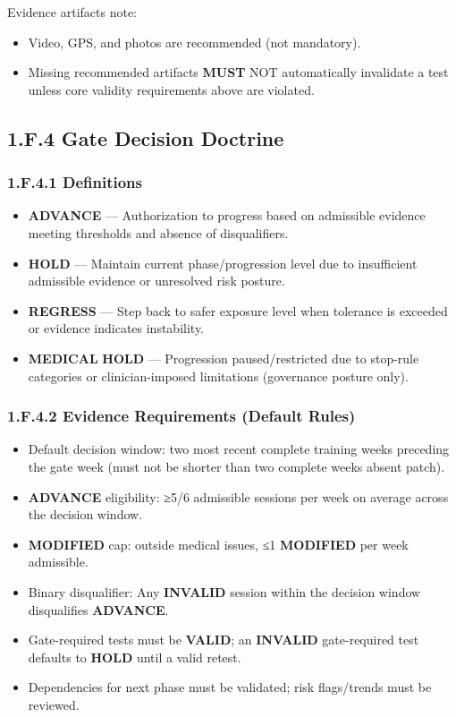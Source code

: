 \documentclass[10pt]{article}
\begin{document}
Evidence artifacts note:

\begin{itemize}
\item Video, GPS, and photos are recommended (not mandatory).
\item Missing recommended artifacts \textbf{MUST} NOT automatically invalidate a test unless core validity requirements above are violated.
\end{itemize}

\newpage

\subsection*{1.F.4 Gate Decision Doctrine}
{}

\subsubsection*{1.F.4.1 Definitions}

\begin{itemize}
\item \textbf{ADVANCE} — Authorization to progress based on admissible evidence meeting thresholds and absence of disqualifiers.
\item \textbf{HOLD} — Maintain current phase/progression level due to insufficient admissible evidence or unresolved risk posture.
\item \textbf{REGRESS} — Step back to safer exposure level when tolerance is exceeded or evidence indicates instability.
\item \textbf{MEDICAL} \textbf{HOLD} — Progression paused/restricted due to stop-rule categories or clinician-imposed limitations (governance posture only).
\end{itemize}

\subsubsection*{1.F.4.2 Evidence Requirements (Default Rules)}

\begin{itemize}
\item Default decision window: two most recent complete training weeks preceding the gate week (must not be shorter than two complete weeks absent patch).
\item \textbf{ADVANCE} eligibility: ≥5/6 admissible sessions per week on average across the decision window.
\item \textbf{MODIFIED} cap: outside medical issues, ≤1 \textbf{MODIFIED} per week admissible.
\item Binary disqualifier: Any \textbf{INVALID} session within the decision window disqualifies \textbf{ADVANCE}.
\item Gate-required tests must be \textbf{VALID}; an \textbf{INVALID} gate-required test defaults to \textbf{HOLD} until a valid retest.
\item Dependencies for next phase must be validated; risk flags/trends must be reviewed.
\end{itemize}
\end{document}
